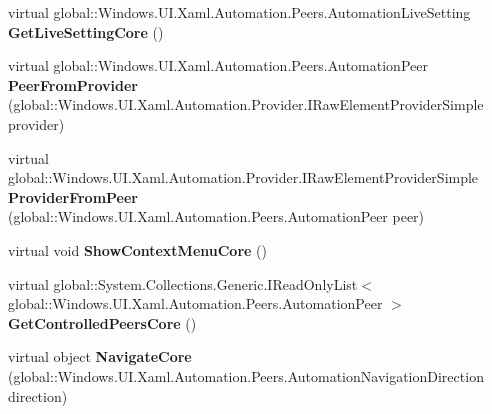 \begin{DoxyCompactItemize}
virtual global\+::\+Windows.\+U\+I.\+Xaml.\+Automation.\+Peers.\+Automation\+Live\+Setting {\bfseries Get\+Live\+Setting\+Core} ()
\item 
\mbox{\label{class_windows_1_1_u_i_1_1_xaml_1_1_automation_1_1_peers_1_1_automation_peer_afb1e787b7ca36dd06affdaa830a30a27}} 
virtual global\+::\+Windows.\+U\+I.\+Xaml.\+Automation.\+Peers.\+Automation\+Peer {\bfseries Peer\+From\+Provider} (global\+::\+Windows.\+U\+I.\+Xaml.\+Automation.\+Provider.\+I\+Raw\+Element\+Provider\+Simple provider)
\item 
\mbox{\label{class_windows_1_1_u_i_1_1_xaml_1_1_automation_1_1_peers_1_1_automation_peer_a8d1ce21375148b3c860bc66fa5df87fa}} 
virtual global\+::\+Windows.\+U\+I.\+Xaml.\+Automation.\+Provider.\+I\+Raw\+Element\+Provider\+Simple {\bfseries Provider\+From\+Peer} (global\+::\+Windows.\+U\+I.\+Xaml.\+Automation.\+Peers.\+Automation\+Peer peer)
\item 
\mbox{\label{class_windows_1_1_u_i_1_1_xaml_1_1_automation_1_1_peers_1_1_automation_peer_a4cf8c7b7bc669694fbf6115b9d508e66}} 
virtual void {\bfseries Show\+Context\+Menu\+Core} ()
\item 
\mbox{\label{class_windows_1_1_u_i_1_1_xaml_1_1_automation_1_1_peers_1_1_automation_peer_a7554757fd9d004f2179de9d68645070c}} 
virtual global\+::\+System.\+Collections.\+Generic.\+I\+Read\+Only\+List$<$ global\+::\+Windows.\+U\+I.\+Xaml.\+Automation.\+Peers.\+Automation\+Peer $>$ {\bfseries Get\+Controlled\+Peers\+Core} ()
\item 
\mbox{\label{class_windows_1_1_u_i_1_1_xaml_1_1_automation_1_1_peers_1_1_automation_peer_afd50c2697f066ad333995dc06a907be4}} 
virtual object {\bfseries Navigate\+Core} (global\+::\+Windows.\+U\+I.\+Xaml.\+Automation.\+Peers.\+Automation\+Navigation\+Direction direction)
\item 
\mbox{\label{class_windows_1_1_u_i_1_1_xaml_1_1_automation_1_1_peers_1_1_automation_peer_ae8260393672adea30e509cee8106d5ef}} 

\end{DoxyCompactItemize}
